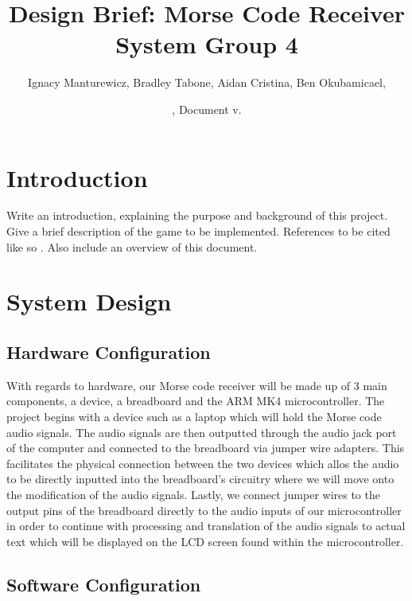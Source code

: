 \documentclass{cce2014-design}
\title{Design Brief: Morse Code Receiver System Group 4}
\author{
   Ignacy Manturewicz,
   Bradley Tabone,
   Aidan Cristina,
   Ben Okubamicael,
   
   }
\date{\svnMaxToday, Document v.\svnInfoMaxRevision}
\begin{document}
\maketitle


\section{Introduction}
Write an introduction, explaining the purpose and background of this project.
Give a brief description of the game to be implemented.
References to be cited like so \cite{stroustrup2000}.
Also include an overview of this document.

\section{System Design}


\subsection{Hardware Configuration}

With regards to hardware, our Morse code receiver will be made up of 3 main components, a device, a breadboard and the ARM MK4 
microcontroller. The project begins with a device such as a laptop which will hold the Morse code audio signals. The audio signals
 are then outputted through the audio jack port of the computer and connected to the breadboard via jumper wire adapters. This 
 facilitates the physical connection between the two devices which allos the audio to be directly inputted into the breadboard's 
 circuitry where we will move onto the modification of the audio signals. Lastly, we connect jumper wires to the output pins of the breadboard 
 directly to the audio inputs of our microcontroller in order to continue with processing and translation of the audio signals to
 actual text which will be displayed on the LCD screen found within the microcontroller.

 \subsection{Software Configuration}
\end{document}
